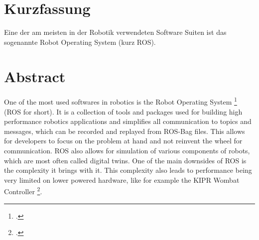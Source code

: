 \chapter{Kurzfassung}

\vspace{10mm}

Eine der am meisten in der Robotik verwendeten Software Suiten ist das sogenannte Robot Operating System (kurz ROS).


\chapter{Abstract}

\vspace{10mm}

One of the most used softwares in robotics is the Robot Operating System \footcite{ros-site} (ROS for short).
It is a collection of tools and packages used for building high performance robotics applications and
simplifies all communication to topics and messages, which can be recorded and replayed from ROS-Bag files.
This allows for developers to focus on the problem at hand and not reinvent the wheel for communication.
ROS also allows for simulation of various components of robots, which are most often called digital twins.
One of the main downsides of ROS is the complexity it brings with it. This complexity also leads to performance
being very limited on lower powered hardware, like for example the KIPR Wombat Controller \footcite{wombat-controller}.
